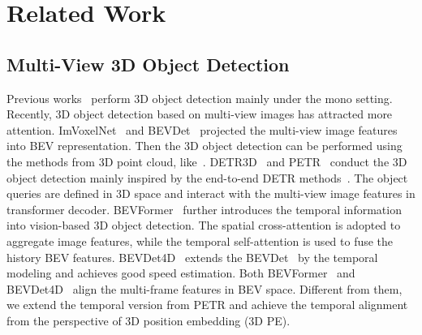 \documentclass[10pt,twocolumn,letterpaper]{article}
\begin{document}
\section{Related Work}
\subsection{Multi-View 3D Object Detection}
Previous works~\cite{chen2016monocular,mousavian20173d,kehl2017ssd,ku2019monocular,simonelli2019disentangling,jorgensen2019monocular,brazil2019m3d,wang2021fcos3d,wang2022pgd} perform 3D object detection mainly under the mono setting. Recently, 3D object detection based on multi-view images has attracted more attention. ImVoxelNet~\cite{rukhovich2022imvoxelnet} and BEVDet~\cite{huang2021bevdet} projected the multi-view image features into BEV representation. Then the 3D object detection can be performed using the methods from 3D point cloud, like~\cite{yin2021center}. DETR3D~\cite{wang2022detr3d} and PETR~\cite{liu2022petr} conduct the 3D object detection mainly inspired by the end-to-end DETR methods~\cite{carion2020detr,zhu2020deformable,meng2021conditional,liu2022dab}. The object queries are defined in 3D space and interact with the multi-view image features in transformer decoder. BEVFormer~\cite{li2022bevformer} further introduces the temporal information into vision-based 3D object detection. The spatial cross-attention is adopted to aggregate image features, while the temporal self-attention is used to fuse the history BEV features. BEVDet4D~\cite{huang2022bevdet4d} extends the BEVDet~\cite{huang2021bevdet} by the temporal modeling and achieves good speed estimation. Both BEVFormer~\cite{li2022bevformer} and BEVDet4D~\cite{huang2022bevdet4d} align the multi-frame features in BEV space. Different from them, we extend the temporal version from PETR and achieve the temporal alignment from the perspective of 3D position embedding (3D PE). 
\end{document}
